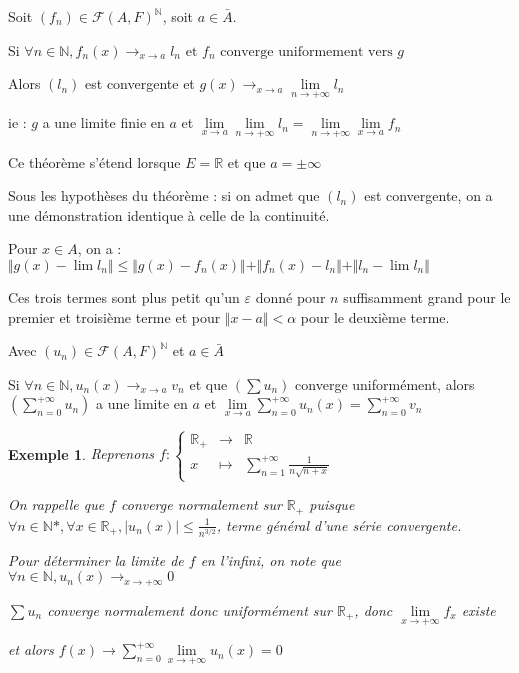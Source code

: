 \documentclass[a4paper,12pt]{book}
\newcommand{\Thr}[2]{\begin{tcolorbox}[sharp corners, colback=white,colframe=red!90!black!75, title=Théorème : #1]#2\end{tcolorbox}}
\newcommand{\Pre}[1]{\begin{tcolorbox}[sharp corners, colback=white,colframe=green!60!green!30!black!75, title=Preuve]#1\end{tcolorbox}}
\newtheorem{Exe}{Exemple}[section]
\def\R{\mathbb{R}}
\def\N{\mathbb{N}}
\begin{document}
\Thr{Extension de limite uniforme}{Soit $(f_n)\in\mathcal{F}(A,F)^\N$, soit $a\in\bar{A}$. \par Si $\forall n\in\N, f_n(x)\to_{x\to a}l_n\text{ et }f_n\text{ converge uniformement vers }g$ \par Alors $(l_n)$ est convergente et $g(x)\to_{x\to a}\lim\limits_{n\to+\infty}l_n$
\par ie : $g$ a une limite finie en $a$ et $\lim\limits_{x\to a} \lim\limits_{n\to+\infty}l_n = \lim\limits_{n\to+\infty}\lim\limits_{x\to a} f_n$ \par Ce théorème s'étend lorsque $E=\R$ et que $a=\pm\infty$}
\Pre{Sous les hypothèses du théorème : si on admet que $(l_n)$ est convergente, on a une démonstration identique à celle de la continuité. \par Pour $x\in A$, on a : $\Vert g(x)-\lim l_n\Vert\leq \Vert g(x)-f_n(x)\Vert + \Vert f_n(x)-l_n\Vert + \Vert l_n-\lim l_n\Vert$ \par Ces trois termes sont plus petit qu'un $\varepsilon$ donné pour $n$ suffisamment grand pour le premier et troisième terme et pour $\Vert x-a\Vert<\alpha$ pour le deuxième terme.}
\Thr{échange de limites de séries}{Avec $(u_n)\in\mathcal{F}(A,F)^\N$ et $a\in\bar{A}$ \par Si $\forall n\in\N, u_n(x)\to_{x\to a}v_n$ et que $(\sum u_n)$ converge uniformément, alors $\left(\sum\limits_{n=0}^{+\infty}u_n\right)$ a une limite en $a$ et $\lim\limits_{x\to a}\sum\limits_{n=0}^{+\infty}u_n(x)=\sum\limits_{n=0}^{+\infty}v_n$}
\begin{Exe}
Reprenons $f:\left\{\begin{array}{rcl} \R_+ & \to & \R \\ x & \mapsto & \sum\limits_{n=1}^{+\infty}\frac{1}{n\sqrt{n+x}}\end{array}\right.$
\par On rappelle que $f$ converge normalement sur $\R_+$ puisque $\forall n\in\N*, \forall x\in\R_+, \vert u_n(x)\vert\leq \frac{1}{n^{3/2}}$, terme général d'une série convergente.
\par Pour déterminer la limite de $f$ en l'infini, on note que $\forall n\in\N, u_n(x)\to_{x\to+\infty}0$
\par $\sum u_n$ converge normalement donc uniformément sur $\R_+$, donc $\lim\limits_{x\to+\infty} f_x$ existe
\par et alors $f(x)\to \sum\limits_{n=0}^{+\infty}\lim\limits_{x\to+\infty} u_n(x) = 0$
\end{Exe}
\end{document}
